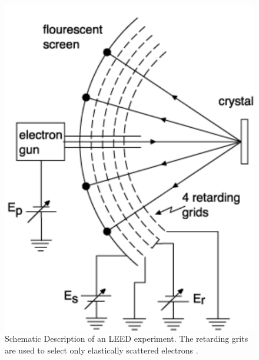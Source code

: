 \documentclass[a4paper]{scrartcl}
\numberwithin{equation}{section}
\numberwithin{figure}{section}
\numberwithin{table}{section}
\begin{document}
\begin{figure}
  \centering
   	\includegraphics[width=\linewidth]{pic/leed.pdf}

 \caption{\small Schematic Description of an LEED experiment. The retarding grits are used to select only elastically scattered electrons \cite{skript}.}
        \label{fig:leed}
\end{figure}
\end{document}
